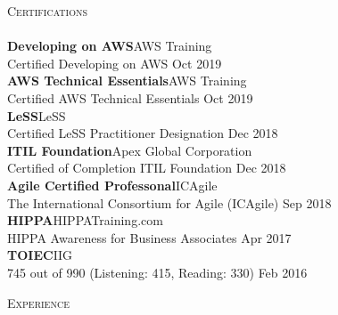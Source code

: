 \documentclass[a4paper]{article}
\newcommand{\lineunder} {
    \vspace*{-8pt} \\
    \hspace*{-18pt} \hrulefill \\
}
\newcommand{\header} [1] {
    {\hspace*{-18pt}\vspace*{6pt} \textsc{#1}}
    \vspace*{-6pt} \lineunder
}
\begin{document}
\header{Certifications}
\textbf{Developing on AWS}\hfill AWS Training\\
Certified Developing on AWS \hfill Oct 2019\\
\vspace{2mm}
\textbf{AWS Technical Essentials}\hfill AWS Training\\
Certified AWS Technical Essentials \hfill Oct 2019\\
\vspace{2mm}
\textbf{LeSS}\hfill LeSS\\
Certified LeSS Practitioner Designation \hfill Dec 2018\\
\vspace{2mm}
\textbf{ITIL Foundation}\hfill Apex Global Corporation\\
Certified of Completion ITIL Foundation \hfill Dec 2018\\
\vspace{2mm}
\textbf{Agile Certified Professonal}\hfill ICAgile\\
The International Consortium for Agile (ICAgile) \hfill Sep 2018\\
\vspace{2mm}
\textbf{HIPPA}\hfill HIPPATraining.com\\
HIPPA Awareness for Business Associates \hfill Apr 2017\\
\vspace{2mm}
\textbf{TOIEC}\hfill IIG\\
745 out of 990 (Listening: 415, Reading: 330) \hfill Feb 2016\\
\vspace{2mm}

\newpage


\header{Experience}
\vspace{1mm}
\end{document}
